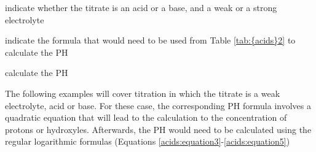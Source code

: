 \documentclass[main.tex]{subfiles}
\newcommand\chapterlabel{acids}
\begin{document}
\begin{description}
\begin{example}
\begin{inparaenum}[(a)]
\item indicate whether the titrate is an acid or a base, and a weak or a strong electrolyte
\item indicate the formula that would need to be used from Table \ref{tab:{\chapterlabel}2} to calculate the PH
\item calculate the PH 
\end{inparaenum}
\end{example}%
The following examples will cover titration in which the titrate is a weak electrolyte, acid or base. For these case, the corresponding PH formula involves a quadratic equation that will lead to the calculation to the concentration of protons or hydroxyles. Afterwards, the PH would need to be calculated using the regular logarithmic formulas (Equations \ref{\chapterlabel:equation3}-\ref{\chapterlabel:equation5})



\end{description}
\end{document}
